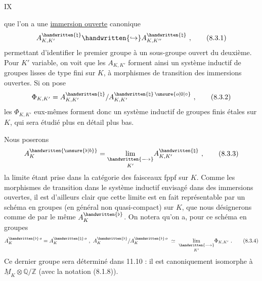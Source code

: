 \hfill IX

que l'on a une \uline{immersion ouverte} canonique
\[
A^{\handwritten{\natural}}_{K,K'}\handwritten{\hookrightarrow}A^{\handwritten{\natural}}_{K,K''}\ ,\tag*{(8.3.1)}
\]
permettant d'identifier le premier groupe à un sous-groupe ouvert du deuxième. Pour $K'$ variable, on voit que les $A_{K,K'}$ forment ainsi un système inductif de groupes lisses de type fini sur $K$, à morphismes de transition des immersions ouvertes. Si on pose
\[
\Phi_{K,K'}=A^{\handwritten{\natural}}_{K,K'}/A^{\handwritten{\natural}\,\unsure{o|0|\circ}}_{K,K'}\ ,\tag*{(8.3.2)}
\]
les $\Phi_{K,K'}$ eux-mêmes forment donc un système inductif de groupes finis étales sur $K$, qui sera étudié plus en détail plus bas.

Nous poserons
\[
A^{\handwritten{\unsure{\flat|b}}}_K=\underset{K'}{\mathop{\lim}\limits_{\handwritten{\longrightarrow}}}A^{\handwritten{\natural}}_{K,K'}\ ,\tag*{(8.3.3)}
\]
la limite étant prise dans la catégorie des faisceaux fppf sur $K$. Comme les morphismes de transition dans le système inductif envisagé dans des immersions ouvertes, il est d'ailleurs clair que cette limite est en fait représentable par un schéma en groupes (en général non quasi-compact) sur $K$, que nous désignerons comme de  par le même  $A^{\handwritten{\flat}}_K$. On notera qu'on a, pour ce schéma en groupes
\[
A_K^{\handwritten{\flat}\,o}=A_K^{\handwritten{\natural}\,o}\ ,\
A_K^{\handwritten{\flat}}/A_K^{\handwritten{\flat}\,o}\ \simeq\
\underset{K'}{\mathop{\lim}\limits_{\handwritten{\longrightarrow}}}\Phi_{K,K'}\ .\tag*{(8.3.4)}
\]
Ce dernier groupe sera déterminé dans 11.10 : il est canoniquement isomorphe à $\underline{M}_K\otimes\mathbb Q/\mathbb Z$ (avec la notation (8.1.8)).

\handwritten{417}
